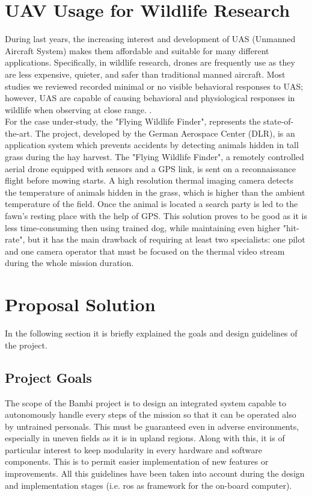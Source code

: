 \section{UAV Usage for Wildlife Research} %
\label{sec:state_of_the_art}
 During last years, the increasing interest and development of UAS (Unmanned Aircraft System) makes them affordable and suitable for many different applications. Specifically, in wildlife research, drones are frequently use as they are less expensive, quieter, and safer than traditional manned aircraft. Most studies we reviewed recorded minimal or no visible behavioral responses to UAS; however, UAS are capable of causing behavioral and physiological responses in wildlife when observing at close range. \cite{doi:10.1002/fee.1281}.\\
 For the case under-study, the "Flying Wildlife Finder", represents the state-of-the-art.
 The project, developed by the German Aerospace Center (DLR), is an application system which prevents accidents by detecting animals hidden in tall grass during the hay harvest. 
 The "Flying Wildlife Finder", a remotely controlled aerial drone equipped with sensors and a GPS link, is sent on a reconnaissance flight before mowing starts. A high resolution thermal imaging camera detects the temperature of animals hidden in the grass, which is higher than the ambient temperature of the field. Once the animal is located a search party is led to the fawn’s resting place with the help of GPS.
 This solution proves to be good as it is less time-consuming then using trained dog, while maintaining even higher "hit-rate", but it has the main drawback of requiring at least two specialists: one pilot and one camera operator that must be focused on the thermal video stream during the whole mission duration.

 
 
 \section{Proposal Solution} %
 \label{sec:proposal_solution}
 In the following section it is briefly explained the goals and design guidelines of the project.

 \subsection{Project Goals} %
 \label{sec:bambisaver_goals}
 The scope of the Bambi project is to design an integrated system capable to autonomously handle every steps of the mission so that it can be operated also by untrained personals. This must be guaranteed even in adverse environments, especially in uneven fields as it is in upland regions. 
 Along with this, it is of particular interest to keep modularity in every hardware and software components. This is to permit easier implementation of new features or improvements.
 All this guidelines  have been taken into account during the design and implementation stages (i.e. \acrshort{ros} as framework for the on-board computer).

